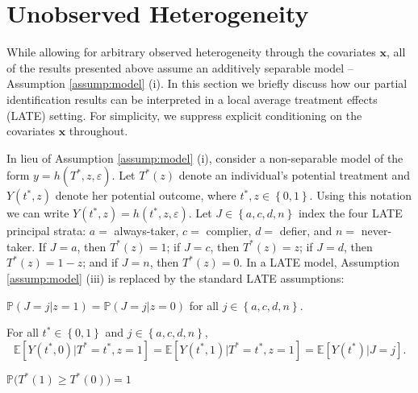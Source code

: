 \section{Unobserved Heterogeneity}
\label{sec:het}
While allowing for arbitrary observed heterogeneity through the covariates $\mathbf{x}$, all of the results presented above assume an additively separable model -- Assumption \ref{assump:model} (i).
In this section we briefly discuss how our partial identification results can be interpreted in a local average treatment effects (LATE) setting.
For simplicity, we suppress explicit conditioning on the covariates $\mathbf{x}$ throughout. 

In lieu of Assumption \ref{assump:model} (i), consider a non-separable model of the form $y = h(T^*,z,\varepsilon)$.
Let $T^*(z)$ denote an individual's potential treatment and $Y(t^*,z)$ denote her potential outcome, where $t^*,z\in \left\{ 0,1 \right\}$.
Using this notation we can write $Y(t^*,z) = h(t^*,z,\varepsilon)$.
Let $J \in \left\{ a, c, d, n \right\}$ index the four LATE principal strata: $a = $ always-taker, $c = $ complier, $d = $ defier, and $n =$ never-taker.
If $J=a$, then $T^*(z) = 1$; if $J=c$, then $T^*(z) = z$; if $J=d$, then $T^*(z) = 1 - z$; and if $J=n$, then $T^*(z)=0$.
In a LATE model, Assumption \ref{assump:model} (iii) is replaced by the standard LATE assumptions:
\begin{assump}
    $\mathbb{P}(J=j|z=1) = \mathbb{P}(J=j|z=0)$ 
  for all  $j\in \left\{ a, c, d, n \right\}$.
\end{assump}
\begin{assump}
    For all $t^* \in \left\{ 0,1 \right\}$ and $j\in \left\{ a, c, d, n \right\}$,
    \[\mathbb{E}\left[Y(t^*,0)|T^*=t^*,z=1\right]=\mathbb{E}\left[Y(t^*,1)|T^*=t^*,z=1\right] = \mathbb{E}[Y(t^*)|J=j].\]
\end{assump}
\begin{assump}[Monotonicity]
    $\mathbb{P}\big(T^*(1) \geq T^*(0)\big) = 1$ 
\end{assump}

